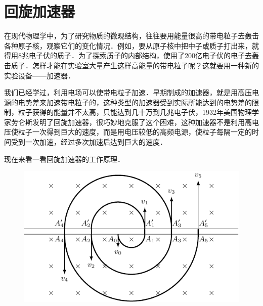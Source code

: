 \section{回旋加速器}


在现代物理学中，为了研究物质的微观结构，往往要用能量很高的带电粒子去轰击各种原子核，观察它们的变化情况．例如，要从原子核中把中子或质子打出来，就得用8兆电子伏的质子．为了探索质子的内部结构，使用了200亿电子伏的电子去轰击质子．怎样才能在实验室大量产生这样高能量的带电粒子呢？这就要用一种新的实验设备——加速器．

我们已经学过，利用电场可以使带电粒子加速．早期制成的加速器，就是用高压电源的电势差来加速带电粒子的，这种类型的加速器受到实际所能达到的电势差的限制，粒子获得的能量并不太高，只能达到几十万到几兆电子伏，1932年美国物理学家劳仑斯发明了回旋加速器，很巧妙地克服了这个困难，这种加速器不是利用高电压使粒子一次得到巨大的速度，而是用电压较低的高频电源，使粒子每隔一定的时间受到一次加速，经过多次加速后达到巨大的速度．

现在来看一看回旋加速器的工作原理．
\begin{figure}[htbp]
    \centering
    \includegraphics{fig/C/1-39.pdf}
    \caption{}\label{fig_C_1-39}
\end{figure}

